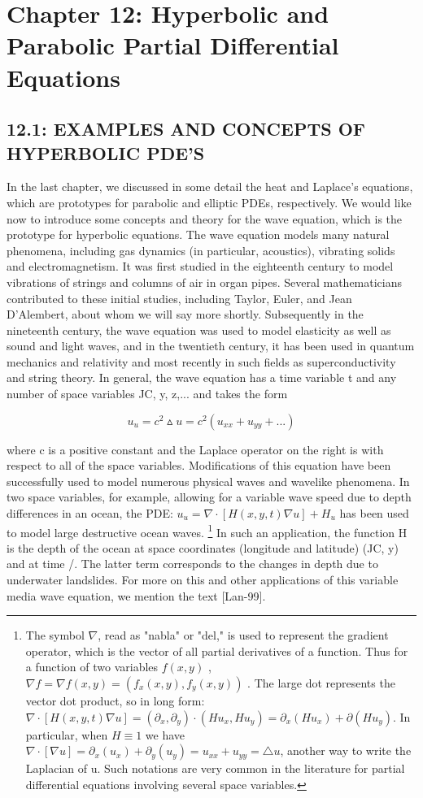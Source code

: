 \documentclass[../main.tex]{subfiles}
\begin{document}
\chapter*{Chapter 12: Hyperbolic and Parabolic Partial
Differential Equations}

\section*{12.1: EXAMPLES AND CONCEPTS OF HYPERBOLIC PDE'S}

In the last chapter, we discussed in some detail the heat and Laplace's equations,
which are prototypes for parabolic and elliptic PDEs, respectively. We would like
now to introduce some concepts and theory for the wave equation, which is the
prototype for hyperbolic equations. The wave equation models many natural
phenomena, including gas dynamics (in particular, acoustics), vibrating solids and
electromagnetism. It was first studied in the eighteenth century to model vibrations
of strings and columns of air in organ pipes. Several mathematicians contributed
to these initial studies, including Taylor, Euler, and Jean D'Alembert, about whom
we will say more shortly. Subsequently in the nineteenth century, the wave
equation was used to model elasticity as well as sound and light waves, and in the
twentieth century, it has been used in quantum mechanics and relativity and most
recently in such fields as superconductivity and string theory. In general, the
wave equation has a time variable t and any number of space variables JC, y, z,...
and takes the form

\begin{equation}
u_u=c^2 \vartriangle u=c^2(u_{xx}+u_{yy}+...) 
\end{equation}

where c is a positive constant and the Laplace operator on the right is with respect
to all of the space variables. Modifications of this equation have been successfully
used to model numerous physical waves and wavelike phenomena. In two space
variables, for example, allowing for a variable wave speed due to depth
differences in an ocean, the PDE:
$u_u=\nabla \cdot[H(x,y,t) \nabla u] + H_u$
has been used to
model large destructive ocean waves. 
\footnote 
{ The symbol $\nabla$, read as "nabla" or "del," is used to represent the gradient operator, which is the
vector of all partial derivatives of a function. Thus for a function of two variables 
$f(x,y)$ , $\nabla f=\nabla  f(x,y)=(f_x(x,y), f_y(x,y))$
. The large dot represents the vector dot product, so in long form: 
$\nabla \cdot [H(x,y,t)\nabla u]= (\partial_x, \partial_y)\cdot (Hu_x, Hu_y)=\partial_x (Hu_x)+\partial(Hu_y)$. In particular, when  $H\equiv 1$ we have $\nabla \cdot [\nabla u]=\partial_x (u_x)+ \partial_y(u_y)=u_{xx}+u_{yy}=\triangle u $, another way to write the Laplacian of u. Such notations
are very common in the literature for partial differential equations involving several space variables.}
In such an application, the function H is the
depth of the ocean at space coordinates (longitude and latitude) (JC, y) and at time /.
The latter term corresponds to the changes in depth due to underwater landslides.
For more on this and other applications of this variable media wave equation, we
mention the text [Lan-99].
\end{document}
